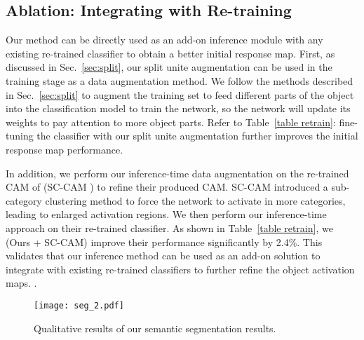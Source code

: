 \documentclass[10pt,twocolumn,letterpaper]{article}
\begin{document}
\subsection{Ablation: Integrating with Re-training}
\label{sec ablation re-train}
Our method can be directly used as an add-on inference module with any existing re-trained classifier to obtain a better initial response map.
First, as discussed in Sec.~\ref{sec:split},
our split  unite augmentation can be used in the training stage as a
data augmentation method. We follow the methods described in Sec.~\ref{sec:split} to augment the training set to
feed different parts of the object into the classification model to train the network, so the network will update its weights to pay attention to more object parts.
Refer to Table~\ref{table retrain}: fine-tuning the classifier with our split  unite augmentation further improves the initial response map performance.



In addition, we perform our inference-time data augmentation on the re-trained CAM of (SC-CAM \cite{chang2020weakly}) to refine their produced CAM. SC-CAM \cite{chang2020weakly} introduced a sub-category clustering method to force the network to activate in more categories, leading to enlarged activation regions. We then perform our inference-time approach on their
re-trained classifier.
As shown in Table~\ref{table retrain},
we (Ours + SC-CAM) improve their performance significantly by 2.4\%.
This validates that our inference method can be used as an add-on solution to integrate with existing re-trained classifiers to further refine the object activation maps.
.










\begin{figure}[t!]
   \begin{center}
   {\texttt{[image: seg\_2.pdf]}}
   \end{center}
\vspace{-2mm}
\caption{Qualitative results of our semantic segmentation results.}
\vspace{-2mm}
   \label{fig: seg}
\end{figure}
\end{document}
